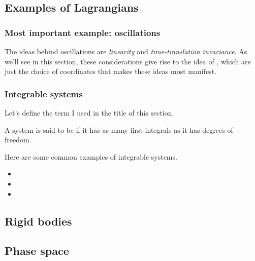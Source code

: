 \documentclass[11pt]{article}
\begin{document}
\subsection{Examples of Lagrangians}

\subsubsection{Most important example: oscillations}

The ideas behind oscillations are \emph{linearity}
and \emph{time-translation invariance}. As we'll
see in this section, these considerations give rise
to the idea of , which are just the
choice of coordinates that makes these ideas most manifest.

\subsubsection{Integrable systems}

Let's define the term I used in the title of this section.

\begin{ddefinition}
    [Integrability]
    A system is said to be  if it has as
    many first integrals as it has degrees of freedom.
\end{ddefinition}

\begin{eexample}
    Here are some common examples of integrable systems.
    \begin{itemize}
        \item {}
        \item {}
        \item {}
    \end{itemize}
\end{eexample}


\subsection{Rigid bodies}


\subsection{Phase space}
\end{document}
